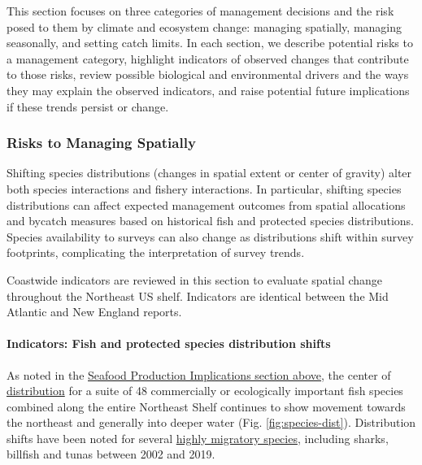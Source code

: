 \documentclass[
  10pt,
]{article}
\begin{document}
This section focuses on three categories of management decisions and the risk posed to them by climate and ecosystem change: managing spatially, managing seasonally, and setting catch limits. In each section, we describe potential risks to a management category, highlight indicators of observed changes that contribute to those risks, review possible biological and environmental drivers and the ways they may explain the observed indicators, and raise potential future implications if these trends persist or change.

\hypertarget{risks-to-managing-spatially}{%
\subsubsection{Risks to Managing Spatially}\label{risks-to-managing-spatially}}

Shifting species distributions (changes in spatial extent or center of gravity) alter both species interactions and fishery interactions. In particular, shifting species distributions can affect expected management outcomes from spatial allocations and bycatch measures based on historical fish and protected species distributions. Species availability to surveys can also change as distributions shift within survey footprints, complicating the interpretation of survey trends.

Coastwide indicators are reviewed in this section to evaluate spatial change throughout the Northeast US shelf. Indicators are identical between the Mid Atlantic and New England reports.

\hypertarget{indicators-fish-and-protected-species-distribution-shifts}{%
\paragraph{Indicators: Fish and protected species distribution shifts}\label{indicators-fish-and-protected-species-distribution-shifts}}

As noted in the \protect\hyperlink{implications}{Seafood Production Implications section above}, the center of \href{https://noaa-edab.github.io/catalog/species_dist.html}{distribution} for a suite of 48 commercially or ecologically important fish species combined along the entire Northeast Shelf continues to show movement towards the northeast and generally into deeper water (Fig. \ref{fig:species-dist}). Distribution shifts have been noted for several \href{https://noaa-edab.github.io/catalog/species_dist.html}{highly migratory species}, including sharks, billfish and tunas between 2002 and 2019.
\end{document}
